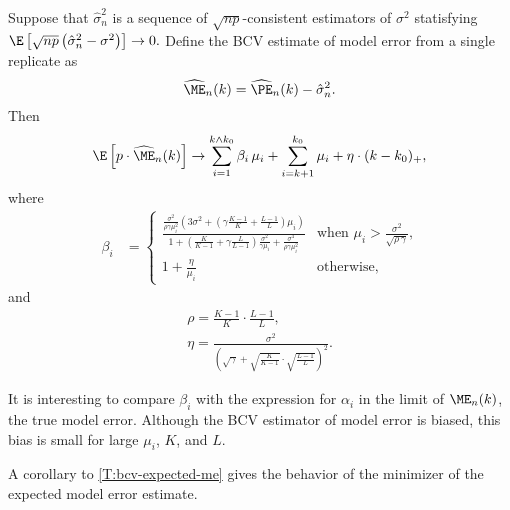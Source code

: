\begin{theorem}\label{T:bcv-expected-me}
	Suppose that $\hat \sigma_n^2$ is a sequence of 
	$\sqrt{n p}$-consistent estimators of $\sigma^2$ statisfying
	\(
		\E\left[
			\sqrt{n p}
				\left(
				\hat \sigma_n^2
				-
				\sigma^2
			\right)
		\right]
		\to
		0.
	\)
	Define the BCV estimate of model error from a single replicate as
	\[
		\widehat{\ME}_n(k)
			=
				\widehat{\PE}_n(k)
				-
				\hat \sigma_n^2.
	\]
	Then
	\[
		\E \left[ p \cdot \widehat{\ME}_n(k) \right]
			\to
				\sum_{i=1}^{k \wedge k_0}
					\beta_i \, \mu_i
				+
				\sum_{i=k+1}^{k_0}
					\mu_i
				+
				\eta
				\cdot
				(k - k_0)_+,
	\]
	where
	\begin{align*}
		\beta_i
			&=
				\begin{cases}
					\frac{
			            \frac{\sigma^2}{\rho \gamma \mu_{i}^2}
			            \left(
			                3 \sigma^2
			                +
							\left(
								\gamma
								\frac{K-1}{K}
								+
								\frac{L-1}{L}
							\right)
			                \mu_{i}
			            \right)
			        }
			        {
			            1
			            +
						\left(
							\frac{K}{K-1}
							+
							\gamma
							\frac{L}{L-1}
						\right)
			            \frac{\sigma^2}{\gamma \mu_{i}}
			            +
			            \frac{\sigma^4}{\rho \gamma \mu_{i}^2}
			        }&\text{when $\mu_{i} > 
								  \frac{\sigma^2}{\sqrt{\rho \, \gamma}}$,} \\
					1 + \frac{\eta}{\mu_i}&\text{otherwise,}
				\end{cases}
	\end{align*}
	and
	\begin{gather*}
		\rho
			=
				\frac{K-1}{K}
				\cdot
				\frac{L-1}{L}, \\
		\eta
			=
				\frac{\sigma^2}
				     {\left(
					      \sqrt{\gamma}
						  +
						  \sqrt{\frac{K}{K-1}} 
						  \cdot 
						  \sqrt{\frac{L-1}{L}}
					  \right)^{2}
					 }.
	\end{gather*}
\end{theorem}

It is interesting to compare $\beta_i$ with the expression for $\alpha_i$
in the limit of $\ME_n(k)$, the true model error.  Although the BCV 
estimator of model error is biased, this bias is small for large 
$\mu_i$, $K$, and $L$.

A corollary to \ref{T:bcv-expected-me} gives the behavior of the
minimizer of the expected model error estimate.



